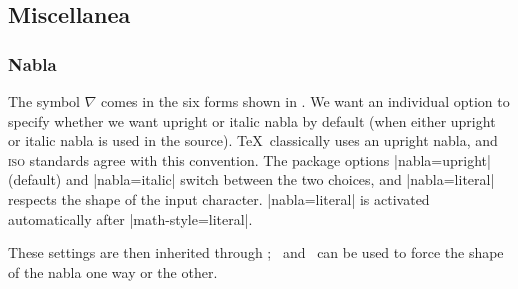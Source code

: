 \subsection{Miscellanea}

\subsubsection{Nabla}

 The symbol $\nabla$ comes in the six forms shown in .
 We want an individual option to specify whether we want upright or italic
 nabla by default (when either upright or italic nabla is used in the
 source). \TeX\ classically uses an upright nabla, and \textsc{iso}
 standards agree with this convention.
 The package options |nabla=upright| (default) and
 |nabla=italic| switch between the two choices, and |nabla=literal| respects
 the shape of the input character.
|nabla=literal| is activated automatically after |math-style=literal|.

These settings are then inherited through \cmd\symbf; \cmd\symit\ and \cmd\symup\ can be used to force the shape of the nabla one way or the other.


